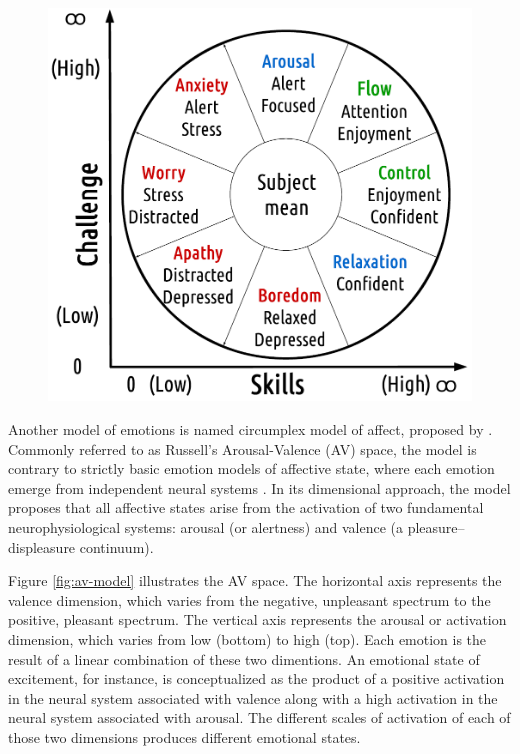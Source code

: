 \begin{figure}[h!]
    \centering
    \includegraphics[scale=0.5]{figures/flow-eight.png}
    \caption{\parencite{nakamura2014concept}}
    \label{fig:flow-eight}
\end{figure}

Another model of emotions is named circumplex model of affect, proposed by \textcite{russell1978evidence}. Commonly referred to as Russell's Arousal-Valence (AV) space, the model is contrary to strictly basic emotion models of affective state, where each emotion emerge from independent neural systems \parencite{posner2005circumplex}. In its dimensional approach, the model proposes that all affective states arise from the activation of two fundamental neurophysiological systems: arousal (or alertness) and valence (a pleasure–displeasure continuum).

Figure \ref{fig:av-model} illustrates the AV space. The horizontal axis represents the valence dimension, which varies from the negative, unpleasant spectrum to the positive, pleasant spectrum. The vertical axis represents the arousal or activation dimension, which varies from low (bottom) to high (top). Each emotion is the result of a linear combination of these two dimentions. An emotional state of excitement, for instance, is conceptualized as the product of a positive activation in the neural system associated with valence along with a high activation in the neural system associated with arousal. The different scales of activation of each of those two dimensions produces different emotional states.

